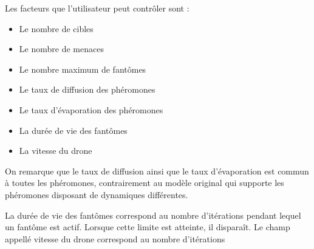 \documentclass[12pt]{article}
\begin{document}
Les facteurs que l'utilisateur peut contrôler sont :

\begin{itemize}
\item{Le nombre de cibles}
\item{Le nombre de menaces}
\item{Le nombre maximum de fantômes}
\item{Le taux de diffusion des phéromones}
\item{Le taux d'évaporation des phéromones}
\item{La durée de vie des fantômes}
\item{La vitesse du drone}
\end{itemize}

On remarque que le taux de diffusion ainsi que le taux d'évaporation
est commun à toutes les phéromones, contrairement au modèle original
qui supporte les phéromones disposant de dynamiques différentes.

La durée de vie des fantômes correspond au nombre d'itérations pendant
lequel un fantôme est actif. Lorsque cette limite est atteinte, il
disparaît. Le champ appellé vitesse du drone correspond au nombre
d'itérations



\end{document}
